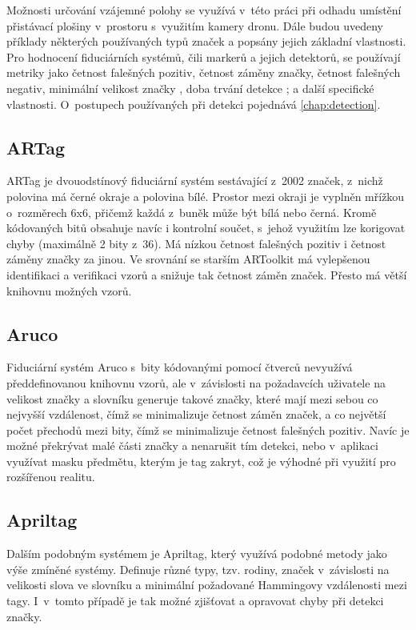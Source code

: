     Možnosti určování vzájemné polohy se využívá v~této práci při odhadu umístění přistávací plošiny v~prostoru s~využitím kamery dronu. Dále budou uvedeny příklady některých používaných typů značek a popsány jejich základní vlastnosti. Pro hodnocení fiduciárních systémů, čili markerů a jejich detektorů, se používají metriky jako četnost falešných pozitiv, četnost záměny značky, četnost falešných negativ, minimální velikost značky \cite{artag}, doba trvání detekce \cite{aruco}; \cite{apriltag2} a další specifické vlastnosti. O~postupech používaných při detekci pojednává \cref{chap:detection}.
    \subsection{ARTag}
      ARTag je dvouodstínový fiduciární systém sestávající z~2002 značek, z~nichž polovina má černé okraje a polovina bílé. Prostor mezi okraji je vyplněn mřížkou o~rozměrech 6x6, přičemž každá z~buněk může být bílá nebo černá. Kromě kódovaných bitů obsahuje navíc i kontrolní součet, s~jehož využitím lze korigovat chyby (maximálně 2 bity z~36). Má nízkou četnost falešných pozitiv i četnost záměny značky za jinou. Ve srovnání se starším ARToolkit má vylepšenou identifikaci a verifikaci vzorů a snižuje tak četnost záměn značek. Přesto má větší knihovnu možných vzorů. \cite{artag}
    \subsection{Aruco}
      Fiduciární systém Aruco s~bity kódovanými pomocí čtverců nevyužívá předdefinovanou knihovnu vzorů, ale v~závislosti na požadavcích uživatele na velikost značky a slovníku generuje takové značky, které mají mezi sebou co nejvyšší vzdálenost, čímž se minimalizuje četnost záměn značek, a co největší počet přechodů mezi bity, čímž se minimalizuje četnost falešných pozitiv. Navíc je možné překrývat malé části značky a nenarušit tím detekci, nebo v~aplikaci využívat masku předmětu, kterým je tag zakryt, což je výhodné při využití pro rozšířenou realitu. \cite{aruco}
    \subsection{Apriltag}
      Dalším podobným systémem je Apriltag, který využívá podobné metody jako výše zmíněné systémy. Definuje různé typy, tzv. rodiny, značek v~závislosti na velikosti slova ve slovníku a minimální požadované Hammingovy vzdálenosti mezi tagy. I~v~tomto případě je tak možné zjišťovat a opravovat chyby při detekci značky. \cite{apriltag2}
      
